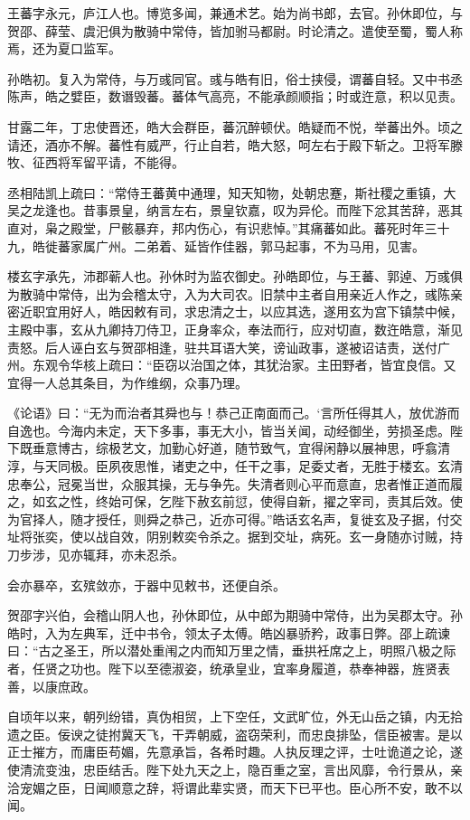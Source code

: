 \documentclass[12pt,UTF8]{ctexbook}
\begin{document}
王蕃字永元，庐江人也。博览多闻，兼通术艺。始为尚书郎，去官。孙休即位，与贺邵、薛莹、虞汜俱为散骑中常侍，皆加驸马都尉。时论清之。遣使至蜀，蜀人称焉，还为夏口监军。

孙皓初。复入为常侍，与万彧同官。彧与皓有旧，俗士挟侵，谓蕃自轻。又中书丞陈声，皓之嬖臣，数谮毁蕃。蕃体气高亮，不能承颜顺指；时或迕意，积以见责。

甘露二年，丁忠使晋还，皓大会群臣，蕃沉醉顿伏。皓疑而不悦，举蕃出外。顷之请还，酒亦不解。蕃性有威严，行止自若，皓大怒，呵左右于殿下斩之。卫将军滕牧、征西将军留平请，不能得。

丞相陆凯上疏曰：“常侍王蕃黄中通理，知天知物，处朝忠蹇，斯社稷之重镇，大吴之龙逢也。昔事景皇，纳言左右，景皇钦嘉，叹为异伦。而陛下忿其苦辞，恶其直对，枭之殿堂，尸骸暴弃，邦内伤心，有识悲悼。”其痛蕃如此。蕃死时年三十九，皓徙蕃家属广州。二弟着、延皆作佳器，郭马起事，不为马用，见害。

楼玄字承先，沛郡蕲人也。孙休时为监农御史。孙皓即位，与王蕃、郭逴、万彧俱为散骑中常侍，出为会稽太守，入为大司农。旧禁中主者自用亲近人作之，彧陈亲密近职宜用好人，皓因敕有司，求忠清之士，以应其选，遂用玄为宫下镇禁中候，主殿中事，玄从九卿持刀侍卫，正身率众，奉法而行，应对切直，数迕皓意，渐见责怒。后人诬白玄与贺邵相逢，驻共耳语大笑，谤讪政事，遂被诏诘责，送付广州。东观令华核上疏曰：“臣窃以治国之体，其犹治家。主田野者，皆宜良信。又宜得一人总其条目，为作维纲，众事乃理。

《论语》曰：“无为而治者其舜也与！恭己正南面而己。‘言所任得其人，放优游而自逸也。今海内未定，天下多事，事无大小，皆当关闻，动经御坐，劳损圣虑。陛下既垂意博古，综极艺文，加勤心好道，随节致气，宜得闲静以展神思，呼翕清淳，与天同极。臣夙夜思惟，诸吏之中，任干之事，足委丈者，无胜于楼玄。玄清忠奉公，冠冕当世，众服其操，无与争先。失清者则心平而意直，忠者惟正道而履之，如玄之性，终始可保，乞陛下赦玄前愆，使得自新，擢之宰司，责其后效。使为官择人，随才授任，则舜之恭己，近亦可得。”皓话玄名声，复徙玄及子据，付交址将张奕，使以战自效，阴别敕奕令杀之。据到交址，病死。玄一身随亦讨贼，持刀步涉，见亦辄拜，亦未忍杀。

会亦暴卒，玄殡敛亦，于器中见敕书，还便自杀。

贺邵字兴伯，会稽山阴人也，孙休即位，从中郎为期骑中常侍，出为吴郡太守。孙皓时，入为左典军，迁中书令，领太子太傅。皓凶暴骄矜，政事日弊。邵上疏谏曰：“古之圣王，所以潜处重闱之内而知万里之情，垂拱衽席之上，明照八极之际者，任贤之功也。陛下以至德淑姿，统承皇业，宜率身履道，恭奉神器，旌贤表善，以康庶政。

自顷年以来，朝列纷错，真伪相贸，上下空任，文武旷位，外无山岳之镇，内无拾遗之臣。佞谀之徒拊冀天飞，干弄朝威，盗窃荣利，而忠良排坠，信臣被害。是以正士摧方，而庸臣苟媚，先意承旨，各希时趣。人执反理之评，士吐诡道之论，遂使清流变浊，忠臣结舌。陛下处九天之上，隐百重之室，言出风靡，令行景从，亲洽宠媚之臣，日闻顺意之辞，将谓此辈实贤，而天下已平也。臣心所不安，敢不以闻。
\end{document}
